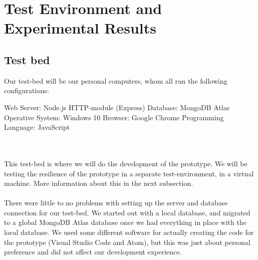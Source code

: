 \section{Test Environment and Experimental Results}
\label{sec:experiments}

\subsection{Test bed}
Our test-bed will be our personal computers, whom all run the following configurations:
\begin{listing}
Web Server: Node.js HTTP-module (Express) \newline
Database: MongoDB Atlas\newline
Operative System: Windows 10 \newline
Browser: Google Chrome \newline
Programming Language: JavaScript
\end{listing}
\\\\
This test-bed is where we will do the development of the prototype. We will be testing the resilience of the prototype in a separate test-environment, in a virtual machine. More information about this in the next subsection.
\\\\
There were little to no problems with setting up the server and database connection for our test-bed. We started out with a local database, and migrated to a global MongoDB Atlas database once we had everything in place with the local database. We used some different software for actually creating the code for the prototype (Visual Studio Code and Atom), but this was just about personal preference and did not affect our development experience. 

